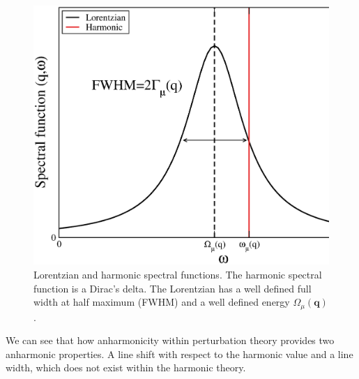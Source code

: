 \begin{figure}[h]
\begin{center}
\includegraphics[width=0.9\linewidth]{Figures/ins-toy1.eps}
\caption[Lorentzian and harmonic spectral functions]{Lorentzian and harmonic spectral functions. The harmonic spectral function is a Dirac's delta. The Lorentzian has a well defined full width at half maximum (FWHM) and a well defined energy $\Omega_{\mu}(\boldsymbol{q})$.}
\label{instoy}
\end{center}
\end{figure}
We can see that how anharmonicity within perturbation theory provides two anharmonic properties. A line shift with respect to the harmonic value and a line width, which does not exist within the harmonic theory. \\

